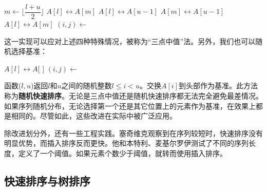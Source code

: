 \documentclass[b5paper]{ctexart}
\begin{document}
\begin{algorithmic}[1]
    \State $m \gets \lfloor \dfrac{l + u}{2} \rfloor$ 
     
      \State {} $A[l] \leftrightarrow A[m]$
    \EndIf
     
      \State {} $A[l] \leftrightarrow A[u-1]$
    \EndIf
     
      \State {} $A[m] \leftrightarrow A[u-1]$
    \EndIf
    \State {} $A[l] \leftrightarrow A[m]$
    \State $(i, j) \gets $ 
    \State {}
    \State {}
  \EndIf
\EndProcedure
\end{algorithmic}

这一实现可以应对上述四种特殊情况，被称为“三点中值”法。另外，我们也可以随机选择基准：

\begin{algorithmic}[1]
    \State {} $A[l] \leftrightarrow A[$  $]$
    \State $(i, j) \gets $ 
    \State {}
    \State {}
  \EndIf
\EndProcedure
\end{algorithmic}

函数($l, u$)返回$l$和$u$之间的随机整数$l \leq i < u$。交换$A[i]$到头部作为基准。此方法称为\textbf{随机快速排序}\cite{CLRS}。无论是三点中值还是随机快速排序都无法完全避免最差情况。如果序列随机分布，无论选择第一个还是其它位置上的元素作为基准，在效果上都是相同的。尽管如此，这些改进在实际中被广泛应用。

除改进划分外，还有一些工程实践。塞奇维克观察到在序列较短时，快速排序没有明显优势，而插入排序反而更快\cite{Bentley}\cite{3-way-part}。他和本特利、麦基尔罗伊测试了不同的序列长度，定义了一个阈值。如果元素个数少于阈值，就转而使用插入排序。

\begin{algorithmic}[1]
    \State {}
  \Else
    \State {}
  \EndIf
\EndProcedure
\end{algorithmic}

\subsection{快速排序与树排序}
\end{document}
